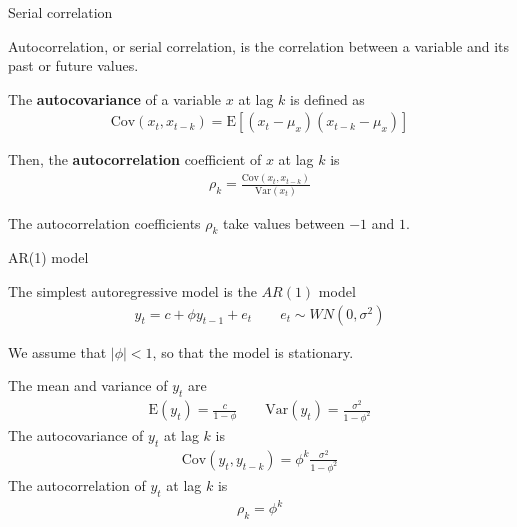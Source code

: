 \documentclass[10pt,aspectratio=169]{beamer}  %
\begin{document}

\begin{frame}{Serial correlation}

    \bigskip
    Autocorrelation, or serial correlation, is the correlation between a variable and its past or future values.

    \medskip
    The \textbf{autocovariance} of a variable $ x $ at lag $ k $ is defined as
    \begin{align*}
        \mathrm{Cov}(x_{t}, x_{t-k}) = \mathrm{E} \left[ (x_{t} - \mu_{x})(x_{t-k} - \mu_{x}) \right]
    \end{align*}

    Then, the \textbf{autocorrelation} coefficient of $ x $ at lag $ k $ is
    \begin{align*}
        \rho_{k} = \frac{\mathrm{Cov}(x_{t}, x_{t-k})}{\mathrm{Var}(x_{t})}
    \end{align*}

    \medskip
    The autocorrelation coefficients $ \rho_{k} $ take values between $ -1 $ and $ 1 $.

\end{frame}


\begin{frame}{AR(1) model}

    \bigskip
    The simplest autoregressive model is the $ AR(1) $ model
    \begin{align*}
        y_{t} = c + \phi y_{t-1} + e_{t} \qquad e_{t} \sim WN(0, \sigma^2)
    \end{align*}

    We assume that $ \left| \phi \right| < 1 $, so that the model is stationary.

    \medskip
    The mean and variance of $ y_{t} $ are
    \begin{align*}
        \mathrm{E}(y_{t}) = \frac{c}{1 - \phi} \qquad \mathrm{Var}(y_{t}) = \frac{\sigma^2}{1 - \phi^2}
    \end{align*}
    The autocovariance of $ y_{t} $ at lag $ k $ is
    \begin{align*}
        \mathrm{Cov}(y_{t}, y_{t-k}) = \phi^k \frac{\sigma^2}{1 - \phi^2}
    \end{align*}
    The autocorrelation of $ y_{t} $ at lag $ k $ is
    \begin{align*}
        \rho_{k} = \phi^k
    \end{align*}

\end{frame}
\end{document}
